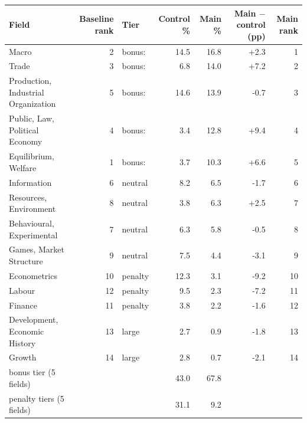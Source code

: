 \begin{tabular}{@{}lrlrrrr@{}}
\toprule
Field & Baseline rank & Tier & Control \% & Main \% & Main $-$ control (pp) & Main rank \\
\midrule
Macro & 2 & bonus: & 14.5 & 16.8 & +2.3 & 1 \\
Trade & 3 & bonus: & 6.8 & 14.0 & +7.2 & 2 \\
Production, Industrial Organization & 5 & bonus: & 14.6 & 13.9 & -0.7 & 3 \\
Public, Law, Political Economy & 4 & bonus: & 3.4 & 12.8 & +9.4 & 4 \\
Equilibrium, Welfare & 1 & bonus: & 3.7 & 10.3 & +6.6 & 5 \\
Information & 6 & neutral & 8.2 & 6.5 & -1.7 & 6 \\
Resources, Environment & 8 & neutral & 3.8 & 6.3 & +2.5 & 7 \\
Behavioural, Experimental & 7 & neutral & 6.3 & 5.8 & -0.5 & 8 \\
Games, Market Structure & 9 & neutral & 7.5 & 4.4 & -3.1 & 9 \\
Econometrics & 10 & penalty & 12.3 & 3.1 & -9.2 & 10 \\
Labour & 12 & penalty & 9.5 & 2.3 & -7.2 & 11 \\
Finance & 11 & penalty & 3.8 & 2.2 & -1.6 & 12 \\
Development, Economic History & 13 & large & 2.7 & 0.9 & -1.8 & 13 \\
Growth & 14 & large & 2.8 & 0.7 & -2.1 & 14 \\
\midrule
bonus tier (5 fields) &  &  & 43.0 & 67.8 &  &  \\
penalty tiers (5 fields) &  &  & 31.1 & 9.2 &  &  \\
\bottomrule
\end{tabular}

